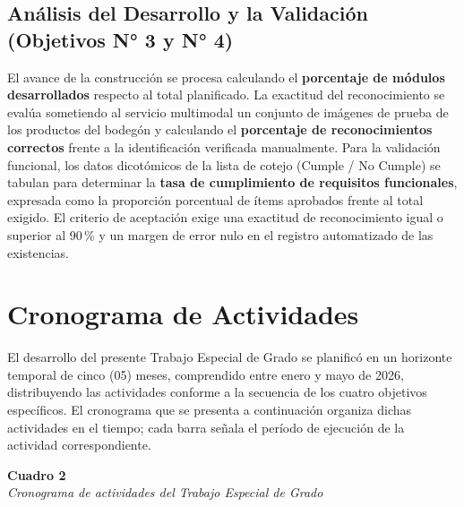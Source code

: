 \documentclass[12pt, letterpaper]{report}
\begin{document}
\subsection{Análisis del Desarrollo y la Validación (Objetivos N° 3 y
N° 4)}

El avance de la construcción se procesa calculando el
\textbf{porcentaje de módulos desarrollados} respecto al total
planificado. La exactitud del reconocimiento se evalúa sometiendo al
servicio multimodal un conjunto de imágenes de prueba de los productos
del bodegón y calculando el \textbf{porcentaje de reconocimientos
correctos} frente a la identificación verificada manualmente. Para la
validación funcional, los datos dicotómicos de la lista de cotejo
(Cumple / No Cumple) se tabulan para determinar la \textbf{tasa de
cumplimiento de requisitos funcionales}, expresada como la proporción
porcentual de ítems aprobados frente al total exigido. El criterio de
aceptación exige una exactitud de reconocimiento igual o superior al
90\,\% y un margen de error nulo en el registro automatizado de las
existencias.

\section{Cronograma de Actividades}

El desarrollo del presente Trabajo Especial de Grado se planificó en un
horizonte temporal de cinco (05) meses, comprendido entre enero y mayo de
2026, distribuyendo las actividades conforme a la secuencia de los cuatro
objetivos específicos. El cronograma que se presenta a continuación
organiza dichas actividades en el tiempo; cada barra señala el período de
ejecución de la actividad correspondiente.

\vspace{12pt}

\noindent\textbf{Cuadro 2}\\
\textit{Cronograma de actividades del Trabajo Especial de Grado}
\vspace{4pt}
\end{document}
